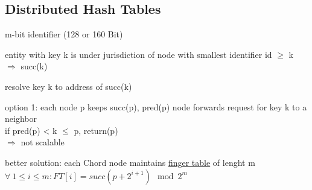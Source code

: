 \documentclass[ngerman,a4paper]{report}
\begin{document}
\subsection{Distributed Hash Tables}
\begin{compactitem}
\item m-bit identifier (128 or 160 Bit)
\item entity with key k is under jurisdiction of node with smallest identifier id $\geq$ k\\
$\Rightarrow$ succ(k)
\item resolve key k to address of succ(k)
\item option 1: each node p keeps succ(p), pred(p) node forwards request for key k to a neighbor\\
if pred(p) < k $\leq$ p, return(p)\\
$\Rightarrow$ not scalable
\item better solution: each Chord node maintains
\underline{finger table} of lenght m\\

$ \forall \  1 \leq i \leq m :	FT[i] = succ(p+2^{i+1}) \mod 2^m $ \\



\end{compactitem}
\end{document}
